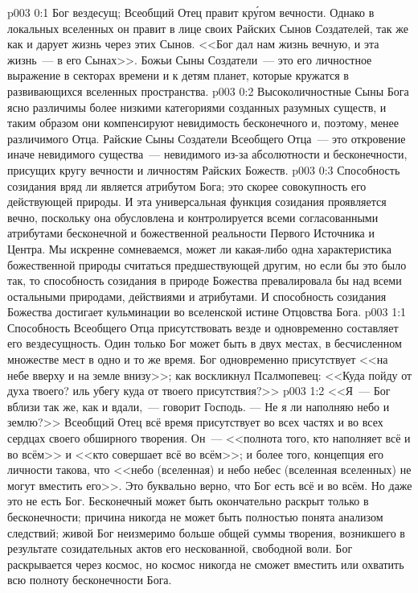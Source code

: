 \author{Божественный Советник}
\vs p003 0:1 Бог вездесущ; Всеобщий Отец правит кр\'угом вечности. Однако в локальных вселенных он правит в лице своих Райских Сынов Создателей, так же как и дарует жизнь через этих Сынов. <<Бог дал нам жизнь вечную, и эта жизнь~--- в его Сынах>>. Божьи Сыны Создатели~--- это его личностное выражение в секторах времени и к детям планет, которые кружатся в развивающихся вселенных пространства.
\vs p003 0:2 Высоколичностные Сыны Бога ясно различимы более низкими категориями созданных разумных существ, и таким образом они компенсируют невидимость бесконечного и, поэтому, менее различимого Отца. Райские Сыны Создатели Всеобщего Отца~--- это откровение иначе невидимого существа~--- невидимого из-за абсолютности и бесконечности, присущих кругу вечности и личностям Райских Божеств.
\vs p003 0:3 \pc Способность созидания вряд ли является атрибутом Бога; это скорее совокупность его действующей природы. И эта универсальная функция созидания проявляется вечно, поскольку она обусловлена и контролируется всеми согласованными атрибутами бесконечной и божественной реальности Первого Источника и Центра. Мы искренне сомневаемся, может ли какая\hyp{}либо одна характеристика божественной природы считаться предшествующей другим, но если бы это было так, то способность созидания в природе Божества превалировала бы над всеми остальными природами, действиями и атрибутами. И способность созидания Божества достигает кульминации во вселенской истине Отцовства Бога.
\vs p003 1:1 Способность Всеобщего Отца присутствовать везде и одновременно составляет его вездесущность. Один только Бог может быть в двух местах, в бесчисленном множестве мест в одно и то же время. Бог одновременно присутствует <<на небе вверху и на земле внизу>>; как воскликнул Псалмопевец: <<Куда пойду от духа твоего? иль убегу куда от твоего присутствия?>>
\vs p003 1:2 <<Я~--- Бог вблизи так же, как и вдали,~--- говорит Господь. --- Не я ли наполняю небо и землю?>> Всеобщий Отец всё время присутствует во всех частях и во всех сердцах своего обширного творения. Он~--- <<полнота того, кто наполняет всё и во всём>> и <<кто совершает всё во всём>>; и более того, концепция его личности такова, что <<небо (вселенная) и небо небес (вселенная вселенных) не могут вместить его>>. Это буквально верно, что Бог есть всё и во всём. Но даже это не есть  Бог. Бесконечный может быть окончательно раскрыт только в бесконечности; причина никогда не может быть полностью понята анализом следствий; живой Бог неизмеримо больше общей суммы творения, возникшего в результате созидательных актов его нескованной, свободной воли. Бог раскрывается через космос, но космос никогда не сможет вместить или охватить всю полноту бесконечности Бога.
